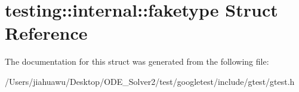 \hypertarget{structtesting_1_1internal_1_1faketype}{}\section{testing\+:\+:internal\+:\+:faketype Struct Reference}
\label{structtesting_1_1internal_1_1faketype}


The documentation for this struct was generated from the following file\+:\begin{DoxyCompactItemize}
\item 
/\+Users/jiahuawu/\+Desktop/\+O\+D\+E\+\_\+\+Solver2/test/googletest/include/gtest/gtest.\+h\end{DoxyCompactItemize}

